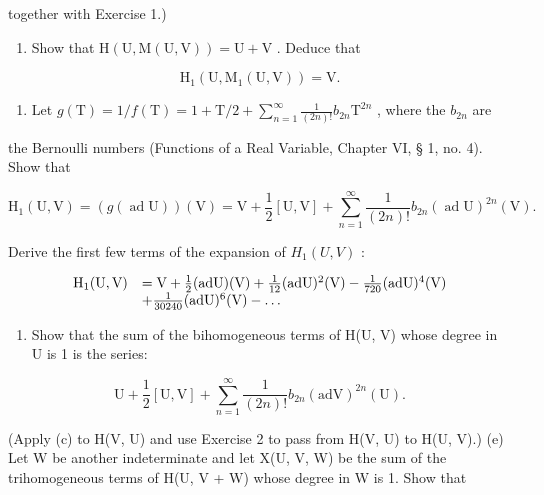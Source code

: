 together with Exercise 1.)

\begin{enumerate}
\def\labelenumi{(\alph{enumi})}
\setcounter{enumi}{1}
\tightlist
\item
  Show that \(\mathrm{H}(\mathrm{U},\mathrm{M}(\mathrm{U},\mathrm{V})) = \mathrm{U} + \mathrm{V}\) . Deduce that
\end{enumerate}

\[
\mathrm{H} _ {1} (\mathrm{U}, \mathrm{M} _ {1} (\mathrm{U}, \mathrm{V})) = \mathrm{V}.
\]

\begin{enumerate}
\def\labelenumi{(\alph{enumi})}
\setcounter{enumi}{2}
\tightlist
\item
  Let \(g(\mathrm{T}) = 1 / f(\mathrm{T}) = 1 + \mathrm{T} / 2 + \sum_{n=1}^{\infty} \frac{1}{(2n)!} b_{2n}\mathrm{T}^{2n}\) , where the \(b_{2n}\) are
\end{enumerate}

the Bernoulli numbers (Functions of a Real Variable, Chapter VI, § 1, no. 4). Show that

\[
\mathrm{H} _ {1} (\mathrm{U}, \mathrm{V}) = (g (\operatorname{ad} \mathrm{U})) (\mathrm{V}) = \mathrm{V} + \frac {1}{2} [ \mathrm{U}, \mathrm{V} ] + \sum_ {n = 1} ^ {\infty} \frac {1}{(2 n) !} b _ {2 n} (\operatorname{ad} \mathrm{U}) ^ {2 n} (\mathrm{V}).
\]

Derive the first few terms of the expansion of \(H_{1}(U, V)\) :

\[
\begin{array}{r l} \mathrm{H} _ {1} (\mathrm{U}, \mathrm{V}) & = \mathrm{V} + \frac {1}{2} (\mathrm{adU}) (\mathrm{V}) + \frac {1}{12} (\mathrm{adU}) ^ {2} (\mathrm{V}) - \frac {1}{720} (\mathrm{adU}) ^ {4} (\mathrm{V}) \\ & + \frac {1}{30240} (\mathrm{adU}) ^ {6} (\mathrm{V}) - \dots \end{array}
\]

\begin{enumerate}
\def\labelenumi{(\alph{enumi})}
\setcounter{enumi}{3}
\tightlist
\item
  Show that the sum of the bihomogeneous terms of H(U, V) whose degree in U is 1 is the series:
\end{enumerate}

\[
\mathrm{U} + \frac {1}{2} [ \mathrm{U}, \mathrm{V} ] + \sum_ {n = 1} ^ {\infty} \frac {1}{(2 n) !} b _ {2 n} (\mathrm{adV}) ^ {2 n} (\mathrm{U}).
\]

(Apply (c) to H(V, U) and use Exercise 2 to pass from H(V, U) to H(U, V).) (e) Let W be another indeterminate and let X(U, V, W) be the sum of the trihomogeneous terms of H(U, V + W) whose degree in W is 1. Show that

